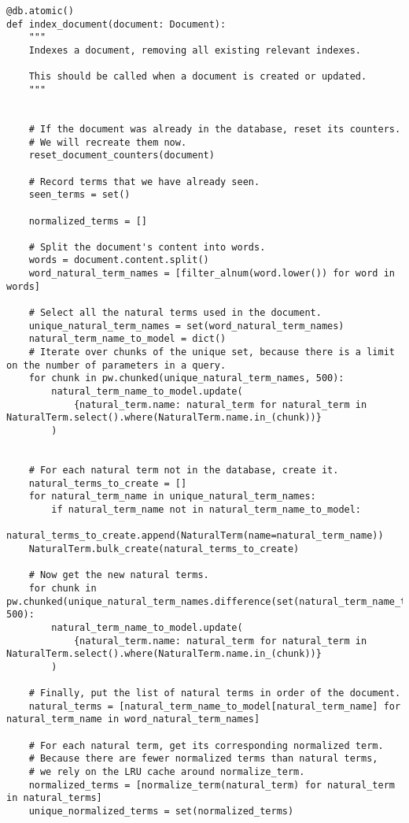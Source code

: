 \documentclass[a4page]{article}
\begin{document}
\begin{verbatim}
@db.atomic()
def index_document(document: Document):
    """
    Indexes a document, removing all existing relevant indexes.

    This should be called when a document is created or updated.
    """


    # If the document was already in the database, reset its counters.
    # We will recreate them now.
    reset_document_counters(document)

    # Record terms that we have already seen.
    seen_terms = set()

    normalized_terms = []

    # Split the document's content into words.
    words = document.content.split()
    word_natural_term_names = [filter_alnum(word.lower()) for word in words]

    # Select all the natural terms used in the document.
    unique_natural_term_names = set(word_natural_term_names)
    natural_term_name_to_model = dict()
    # Iterate over chunks of the unique set, because there is a limit on the number of parameters in a query.
    for chunk in pw.chunked(unique_natural_term_names, 500):
        natural_term_name_to_model.update(
            {natural_term.name: natural_term for natural_term in NaturalTerm.select().where(NaturalTerm.name.in_(chunk))}
        )


    # For each natural term not in the database, create it.
    natural_terms_to_create = []
    for natural_term_name in unique_natural_term_names:
        if natural_term_name not in natural_term_name_to_model:
            natural_terms_to_create.append(NaturalTerm(name=natural_term_name))
    NaturalTerm.bulk_create(natural_terms_to_create)

    # Now get the new natural terms.
    for chunk in pw.chunked(unique_natural_term_names.difference(set(natural_term_name_to_model)), 500):
        natural_term_name_to_model.update(
            {natural_term.name: natural_term for natural_term in NaturalTerm.select().where(NaturalTerm.name.in_(chunk))}
        )
    
    # Finally, put the list of natural terms in order of the document.
    natural_terms = [natural_term_name_to_model[natural_term_name] for natural_term_name in word_natural_term_names]

    # For each natural term, get its corresponding normalized term.
    # Because there are fewer normalized terms than natural terms,
    # we rely on the LRU cache around normalize_term.
    normalized_terms = [normalize_term(natural_term) for natural_term in natural_terms]
    unique_normalized_terms = set(normalized_terms)


\end{verbatim}
\end{document}
